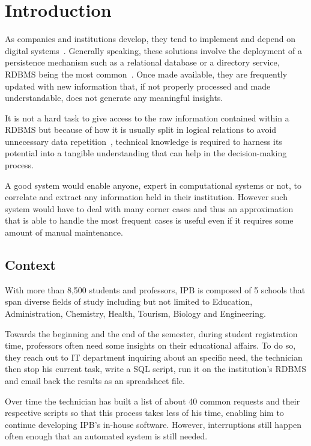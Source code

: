 \chapter{Introduction}
As companies and institutions develop, they tend to implement and depend on digital systems~\cite{ibm}. Generally speaking, these solutions involve the deployment of a persistence mechanism such as a relational database or a directory service, \gls{RDBMS} being the most common~\cite{apachedp}. Once  made available, they are frequently updated with new information that, if not properly processed and made understandable, does not generate any meaningful insights.

It is not a hard task to give access to the raw information contained within a \gls{RDBMS} but because of how it is usually split in logical relations to avoid unnecessary data repetition~\cite[Part~$\mathrm{V}$]{vaquinha}, technical knowledge is required to harness its potential into a tangible understanding that can help in the decision-making process. 

A good system would enable anyone, expert in computational systems or not, to correlate and extract any information held in their institution. However such system would have to deal with many corner cases and thus an approximation that is able to handle the most frequent cases is useful even if it requires some amount of manual maintenance.

\section{Context}\label{context}
With more than 8,500 students and professors, \gls{IPB} is composed of 5 schools that span diverse fields of study including but not limited to Education, Administration, Chemistry, Health, Tourism, Biology and Engineering.

Towards the beginning and the end of the semester, during student registration time, professors often need some insights on their educational affairs. To do so, they reach out to \gls{IT} department inquiring about an specific need, the technician then stop his current task, write a \gls{SQL} script, run it on the institution's \gls{RDBMS} and email back the results as an spreadsheet file.

Over time the technician has built a list of about 40 common requests and their respective scripts so that this process takes less of his time, enabling him to continue developing \gls{IPB}'s in-house software. However, interruptions still happen often enough that an automated system is still needed.

